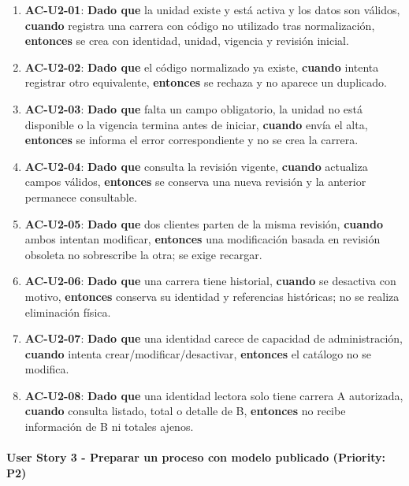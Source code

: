 \documentclass[11pt,a4paper]{article}
\providecommand{\tightlist}{\setlength{\itemsep}{0pt}\setlength{\parskip}{0pt}}
\begin{document}
\begin{enumerate}
\def\labelenumi{\arabic{enumi}.}
\tightlist
\item
  \textbf{AC-U2-01}: \textbf{Dado que} la unidad existe y está activa y
  los datos son válidos, \textbf{cuando} registra una carrera con código
  no utilizado tras normalización, \textbf{entonces} se crea con
  identidad, unidad, vigencia y revisión inicial.
\item
  \textbf{AC-U2-02}: \textbf{Dado que} el código normalizado ya existe,
  \textbf{cuando} intenta registrar otro equivalente, \textbf{entonces}
  se rechaza y no aparece un duplicado.
\item
  \textbf{AC-U2-03}: \textbf{Dado que} falta un campo obligatorio, la
  unidad no está disponible o la vigencia termina antes de iniciar,
  \textbf{cuando} envía el alta, \textbf{entonces} se informa el error
  correspondiente y no se crea la carrera.
\item
  \textbf{AC-U2-04}: \textbf{Dado que} consulta la revisión vigente,
  \textbf{cuando} actualiza campos válidos, \textbf{entonces} se
  conserva una nueva revisión y la anterior permanece consultable.
\item
  \textbf{AC-U2-05}: \textbf{Dado que} dos clientes parten de la misma
  revisión, \textbf{cuando} ambos intentan modificar, \textbf{entonces}
  una modificación basada en revisión obsoleta no sobrescribe la otra;
  se exige recargar.
\item
  \textbf{AC-U2-06}: \textbf{Dado que} una carrera tiene historial,
  \textbf{cuando} se desactiva con motivo, \textbf{entonces} conserva su
  identidad y referencias históricas; no se realiza eliminación física.
\item
  \textbf{AC-U2-07}: \textbf{Dado que} una identidad carece de capacidad
  de administración, \textbf{cuando} intenta crear/modificar/desactivar,
  \textbf{entonces} el catálogo no se modifica.
\item
  \textbf{AC-U2-08}: \textbf{Dado que} una identidad lectora solo tiene
  carrera A autorizada, \textbf{cuando} consulta listado, total o
  detalle de B, \textbf{entonces} no recibe información de B ni totales
  ajenos.
\end{enumerate}

\paragraph{User Story 3 - Preparar un proceso con modelo publicado
(Priority:
P2)}\label{user-story-3---preparar-un-proceso-con-modelo-publicado-priority-p2}
\end{document}
